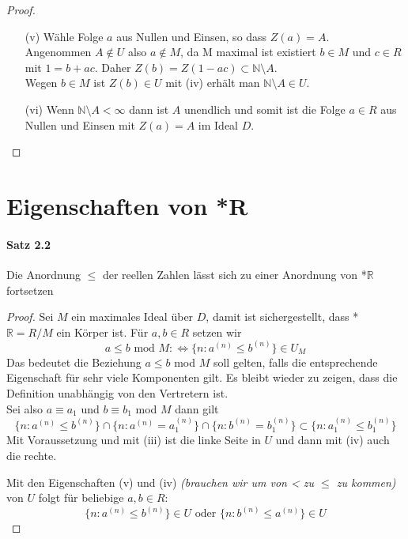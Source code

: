 \documentclass[a4paper]{article}
\begin{document}
\begin{proof} $ \text{ } $
\begin{enumerate}
     \item[(v)] Wähle Folge $ a $ aus Nullen und Einsen, so dass $ Z(a) = A $. \\ 
            Angenommen $ A \notin U $ also $ a \notin M $, da M maximal ist existiert $ b \in M $ und $ c \in R $ mit 
            $ 1 = b + ac $. Daher $ Z(b) = Z(1 - ac) \subset \mathbb{N} \setminus A $.  \\ 
            Wegen $ b \in M $ ist $ Z(b) \in U $ mit (iv) erhält man $ \mathbb{N} \setminus A \in U $.
            \bigskip
     \item[(vi)] Wenn $ \mathbb{N} \setminus A < \infty $ dann ist $ A $ unendlich und somit ist die 
            Folge $ a \in R $ aus Nullen und Einsen mit $ Z(a) = A $ im Ideal $ D $.
\end{enumerate}
\end{proof}




\section{Eigenschaften von *R}

\paragraph{Satz 2.2} Die Anordnung $\leqslant$ der reellen Zahlen lässt 
sich zu einer Anordnung von *$\mathbb{R}$ fortsetzen
\begin{proof}
      Sei $ M $ ein maximales Ideal über $ D $, damit ist sichergestellt, dass *$\mathbb{R} = R/M $ ein Körper ist.
      Für $ a,b \in R $ setzen wir 
      $$ a \leqslant b \text{ mod } M :\iff \{n: a^{(n)} \leqslant b^{(n)}\} \in U_M $$ 
      Das bedeutet die Beziehung $ a\leqslant b $ mod $ M $ soll gelten, falls die entsprechende Eigenschaft
      für sehr viele Komponenten gilt. 
      Es bleibt wieder zu zeigen, dass die Definition unabhängig von den Vertretern ist. \\
      Sei also $ a \equiv a_1 $ und $ b \equiv b_1 $ mod $ M $ dann gilt 
      $$ \{n: a^{(n)} \leqslant b^{(n)}\} \cap \{n: a^{(n)} = a^{(n)}_1\} \cap \{n: b^{(n)} = b^{(n)}_1\} \subset \{n: a^{(n)}_1 \leqslant b^{(n)}_1\} $$
      Mit Voraussetzung und mit (iii) ist die linke Seite in $ U $ und dann mit (iv) auch die rechte.

      \bigskip
      Mit den Eigenschaften (v) und (iv) \textit{(brauchen wir um von < zu $ \leqslant $ zu kommen)} von $ U $ folgt für beliebige $ a,b \in R: $
      $$ \{n: a^{(n)} \leqslant b^{(n)}\} \in U \text{ oder } \{n: b^{(n)} \leqslant a^{(n)}\} \in U $$
\end{proof}
\end{document}
